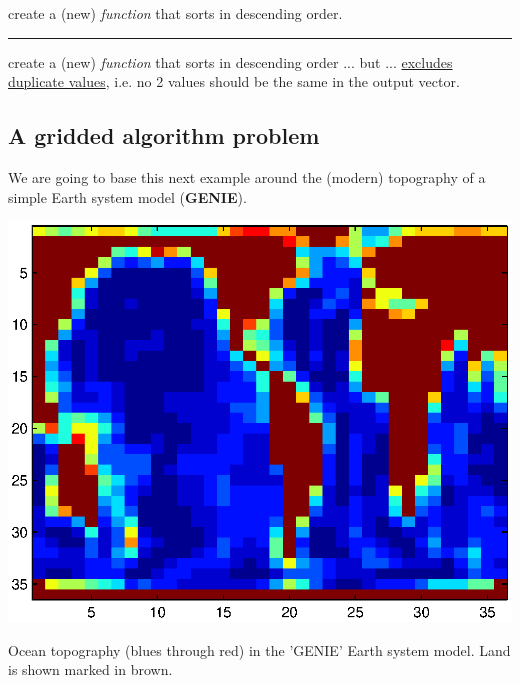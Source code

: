 \documentclass{tufte-book} %
\begin{document}
 create a (new) \textit{function} that sorts in descending order.

\vspace{1mm}
\noindent\rule{4cm}{0.5pt}
\vspace{-2mm}

 create a (new) \textit{function} that sorts in descending order ... but ... \uline{excludes duplicate values}, i.e. no 2 values should be the same in the output vector.


\newpage

\subsection{A gridded algorithm problem}

We are going to base this next example around the (modern) topography of a simple Earth system model (\textbf{GENIE}).

\begin{marginfigure}[0.0in]
\includegraphics[width=\linewidth]{ch3-genietopo.eps}
\caption{Ocean topography (blues through red) in the 'GENIE' Earth system model. Land is shown marked in brown.}
\label{fig:ch3-genietopo}
\end{marginfigure}
\end{document}
